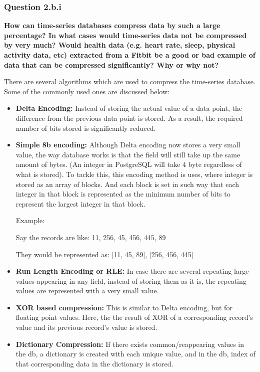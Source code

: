 \documentclass[a4paper, 12pt]{article}
\begin{document}
\subsubsection*{Question 2.b.i}
\textbf{How can time-series databases compress data by such a large percentage? 
In what cases would time-series data not be compressed by very much?
Would health data (e.g. heart rate, sleep, physical activity data, etc)
extracted from a Fitbit be a good or bad example of data that can be
compressed significantly? Why or why not?}

\vspace{0.5em}

There are several algorithms which are used to compress the time-series database. Some of the commonly used ones are discussed below:

\begin{itemize}
    \item \textbf{Delta Encoding:} Instead of storing the actual value of a data point, the difference from the previous data point is stored. As a result, the required number of bits stored is significantly reduced.

    \item \textbf{Simple 8b encoding:} Although Delta encoding now stores a very small value, the way database works is that the field will still take up the same amount of bytes. (An integer in PostgreSQL will take 4 byte regardless of what is stored). To tackle this, this encoding method is uses, where integer is stored as an array of blocks. And each block is set in such way that each integer in that block is represented as the minimum number of bits to represent the largest integer in that block.

    Example:
    
        Say the records are like: 11, 256, 45, 456, 445, 89
        
        They would be represented as: [11, 45, 89], [256, 456, 445]

    \item \textbf{Run Length Encoding or RLE: }In case there are several repeating large values appearing in any field, instead of storing them as it is, the repeating values are represented with a very small value.

    \item \textbf{XOR based compression:} This is similar to Delta encoding, but for floating point values. Here, the the result of XOR of a corresponding record's value and its previous record's value is stored.

    \item \textbf{Dictionary Compression:} If there exists common/reappearing values in the db, a dictionary is created with each unique value, and in the db, index of that corresponding data in the dictionary is stored.
\end{itemize}
\end{document}

